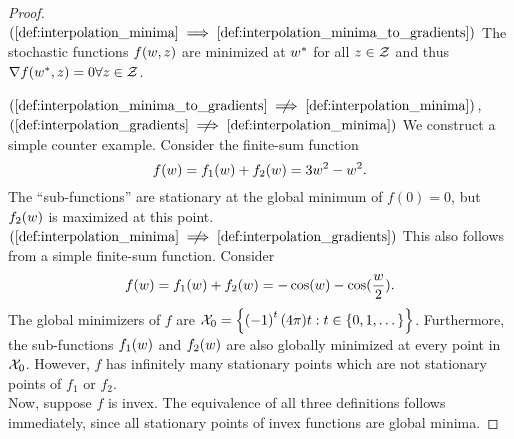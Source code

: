 \interpRelationships*
{}
\begin{proof}
    \( (\autoref{def:interpolation_minima} \implies \autoref{def:interpolation_minima_to_gradients}) \)
    The stochastic functions \( f(w,z) \) are minimized at \( w^* \) for all \( z \in \mathcal{Z} \) and thus \( \nabla f(w^*, z) = 0 \forall z \in \mathcal{Z} \).\\


    \( (\autoref{def:interpolation_minima_to_gradients} \centernot \implies \autoref{def:interpolation_minima}) \), \(
    (\autoref{def:interpolation_gradients} \centernot \implies \autoref{def:interpolation_minima}) \)
    We construct a simple counter example.
    Consider the finite-sum function
    \[ f(w) = f_1(w) + f_2(w) = 3w^2 - w^2. \]
    The ``sub-functions'' are stationary at the global minimum of \( f(0) = 0 \), but \( f_2(w) \) is maximized at this point.\\

    \( (\autoref{def:interpolation_minima} \centernot \implies \autoref{def:interpolation_gradients}) \) This also follows from a simple finite-sum function.
    Consider
    \[ f(w) = f_1(w) + f_2(w) = - \cos(w) - \cos(\frac{w}{2}). \]
    The global minimizers of \( f \) are \(\mathcal{X}_0 = \left\{\left(-1\right)^{t} (4\pi) t : t \in \left\{0,1, \dots \right\}\right\} \).
    Furthermore, the sub-functions \( f_1(w) \) and \( f_2(w) \) are also globally minimized at every point in \( \mathcal{X}_0 \).
    However, \( f \) has infinitely many stationary points which are not stationary points of \( f_1 \) or \( f_2 \).\\

    Now, suppose \( f \) is invex. The equivalence of all three definitions follows immediately, since all stationary points of invex functions are global minima.
\end{proof}

\boundedBelow*
{}

